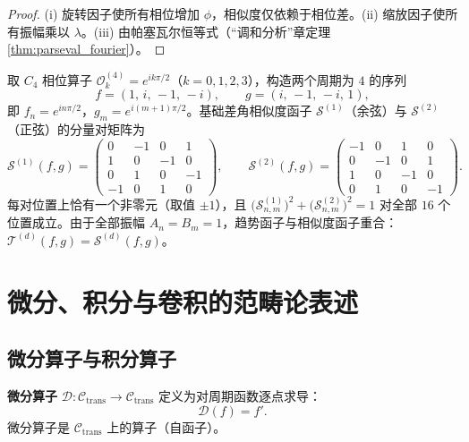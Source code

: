 \begin{proof}
(i) 旋转因子使所有相位增加 $\phi$，相似度仅依赖于相位差。(ii) 缩放因子使所有振幅乘以 $\lambda$。(iii) 由帕塞瓦尔恒等式（“调和分析”章定理 \ref{thm:parseval_fourier}）。
\end{proof}

\begin{example}[$C_4$ 上的相似度函子与趋势函子矩阵]\label{ch13_c4_similarity_example}
取 $C_4$ 相位算子 $\mathcal{O}_k^{(4)} = e^{i k\pi/2}$（$k = 0,1,2,3$），构造两个周期为 $4$ 的序列
\[
f = (1,\, i,\, -1,\, -i), \qquad g = (i,\, -1,\, -i,\, 1),
\]
即 $f_n = e^{i n\pi/2}$，$g_m = e^{i (m+1)\pi/2}$。基础差角相似度函子 $\mathcal{S}^{(1)}$（余弦）与 $\mathcal{S}^{(2)}$（正弦）的分量对矩阵为
\[
\mathcal{S}^{(1)}(f, g) =
\begin{pmatrix}
0 & -1 & 0 & 1 \\
1 & 0 & -1 & 0 \\
0 & 1 & 0 & -1 \\
-1 & 0 & 1 & 0
\end{pmatrix}, \qquad
\mathcal{S}^{(2)}(f, g) =
\begin{pmatrix}
-1 & 0 & 1 & 0 \\
0 & -1 & 0 & 1 \\
1 & 0 & -1 & 0 \\
0 & 1 & 0 & -1
\end{pmatrix}.
\]
每对位置上恰有一个非零元（取值 $\pm 1$），且 $\big(\mathcal{S}^{(1)}_{n,m}\big)^2 + \big(\mathcal{S}^{(2)}_{n,m}\big)^2 = 1$ 对全部 $16$ 个位置成立。由于全部振幅 $A_n = B_m = 1$，趋势函子与相似度函子重合：$\mathcal{T}^{(d)}(f, g) = \mathcal{S}^{(d)}(f, g)$。
\end{example}

\section{微分、积分与卷积的范畴论表述}\label{sec:diff_int_conv_category}

\subsection{微分算子与积分算子}

\begin{definition}[微分算子]\label{def:differential_operator}
\textbf{微分算子} $\mathcal{D}: \mathcal{C}_{\text{trans}} \to \mathcal{C}_{\text{trans}}$ 定义为对周期函数逐点求导：
\[
\mathcal{D}(f) = f'.
\]
微分算子是 $\mathcal{C}_{\text{trans}}$ 上的算子（自函子）。
\end{definition}

